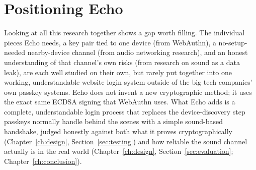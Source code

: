 \section{Positioning Echo}
\label{sec:lit-position}

Looking at all this research together shows a gap worth filling. The
individual pieces Echo needs, a key pair tied to one device (from
WebAuthn), a no-setup-needed nearby-device channel (from audio networking
research), and an honest understanding of that channel's own risks (from
research on sound as a data leak), are each well studied on their own, but
rarely put together into one working, understandable website login system
outside of the big tech companies' own passkey systems. Echo does not
invent a new cryptographic method; it uses the exact same ECDSA signing
that WebAuthn uses. What Echo adds is a complete, understandable login
process that replaces the device-discovery step passkeys normally handle
behind the scenes with a simple sound-based handshake, judged honestly
against both what it proves cryptographically
(Chapter~\ref{ch:design}, Section~\ref{sec:testing}) and how reliable the
sound channel actually is in the real world
(Chapter~\ref{ch:design}, Section~\ref{sec:evaluation};
Chapter~\ref{ch:conclusion}).
